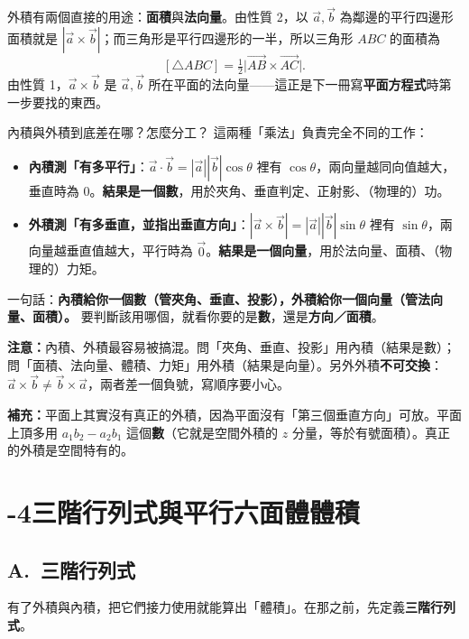 \documentclass[11pt]{article}
\begin{document}
外積有兩個直接的用途：\textbf{面積}與\textbf{法向量}。由性質 2，以 $\vec a,\vec b$ 為鄰邊的平行四邊形面積就是 $|\vec a\times\vec b|$；而三角形是平行四邊形的一半，所以三角形 $ABC$ 的面積為
$$[\triangle ABC]=\tfrac12\bigl|\vec{AB}\times\vec{AC}\bigr|.$$
由性質 1，$\vec a\times\vec b$ 是 $\vec a,\vec b$ 所在平面的法向量——這正是下一冊寫\textbf{平面方程式}時第一步要找的東西。

\begin{補充框}{內積與外積到底差在哪？怎麼分工？}
這兩種「乘法」負責完全不同的工作：
\begin{itemize}\setlength{\itemsep}{2pt}
\item \textbf{內積測「有多平行」}：$\vec a\cdot\vec b=|\vec a||\vec b|\cos\theta$ 裡有 $\cos\theta$，兩向量越同向值越大，垂直時為 $0$。\textbf{結果是一個數}，用於夾角、垂直判定、正射影、（物理的）功。
\item \textbf{外積測「有多垂直，並指出垂直方向」}：$|\vec a\times\vec b|=|\vec a||\vec b|\sin\theta$ 裡有 $\sin\theta$，兩向量越垂直值越大，平行時為 $\vec 0$。\textbf{結果是一個向量}，用於法向量、面積、（物理的）力矩。
\end{itemize}
一句話：\textbf{內積給你一個數（管夾角、垂直、投影），外積給你一個向量（管法向量、面積）。} 要判斷該用哪個，就看你要的是\textbf{數}，還是\textbf{方向／面積}。

\textbf{注意：}內積、外積最容易被搞混。問「夾角、垂直、投影」用內積（結果是數）；問「面積、法向量、體積、力矩」用外積（結果是向量）。另外外積\textbf{不可交換}：$\vec a\times\vec b\ne\vec b\times\vec a$，兩者差一個負號，寫順序要小心。

\textbf{補充：}平面上其實沒有真正的外積，因為平面沒有「第三個垂直方向」可放。平面上頂多用 $a_1b_2-a_2b_1$ 這個\textbf{數}（它就是空間外積的 $z$ 分量，等於有號面積）。真正的外積是空間特有的。
\end{補充框}

\section*{-4\quad 三階行列式與平行六面體體積}

\subsection*{\sffamily A.\ 三階行列式}

有了外積與內積，把它們接力使用就能算出「體積」。在那之前，先定義\textbf{三階行列式}。
\end{document}
